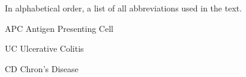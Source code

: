 \documentclass[../main.tex]{subfiles}
\begin{document}
In alphabetical order, a list of all abbreviations used in the text. 

APC \quad \quad \quad Antigen Presenting Cell

UC \quad \quad \quad Ulcerative Colitis

CD \quad \quad \quad Chron's Disease
\end{document}
